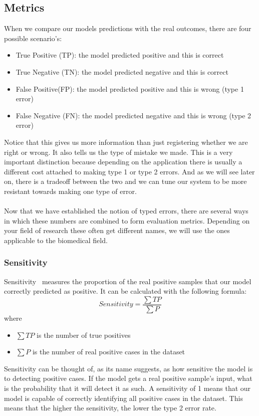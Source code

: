 \subsection{Metrics}
When we compare our models predictions with the real outcomes, there are four possible scenario's:
\begin{itemize}
	\item True Positive (TP): the model predicted positive and this is correct
	\item True Negative (TN): the model predicted negative and this is correct
	\item False Positive(FP): the model predicted positive and this is wrong (type 1 error)
	\item False Negative (FN): the model predicted negative and this is wrong (type 2 error)
\end{itemize}
Notice that this gives us more information than just registering whether we are right or wrong. It also tells us the type of mistake we made. This is a very important distinction because depending on the application there is usually a different cost attached to making type 1 or type 2 errors. And as we will see later on, there is a tradeoff between the two and we can tune our system to be more resistant towards making one type of error. \\ \\
Now that we have established the notion of typed errors, there are several ways in which these numbers are combined to form evaluation metrics. Depending on your field of research these often get different names, we will use the ones applicable to the biomedical field.
\subsubsection{Sensitivity}
Sensitivity~\cite{wikisensspec} measures the proportion of the real positive samples that our model correctly predicted as positive. It can be calculated with the following formula:
$$
Sensitivity = \frac{\sum{TP}}{\sum{P}}
$$
where
\begin{itemize}
	\item $\sum{TP}$ is the number of true positives
	\item $\sum{P}$ is the number of real positive cases in the dataset
\end{itemize}
Sensitivity can be thought of, as its name suggests, as how sensitive the model is to detecting positive cases. If the model gets a real positive sample's input, what is the probability that it will detect it as such. A sensitivity of 1 means that our model is capable of correctly identifying all positive cases in the dataset. This means that the higher the sensitivity, the lower the type 2 error rate.
